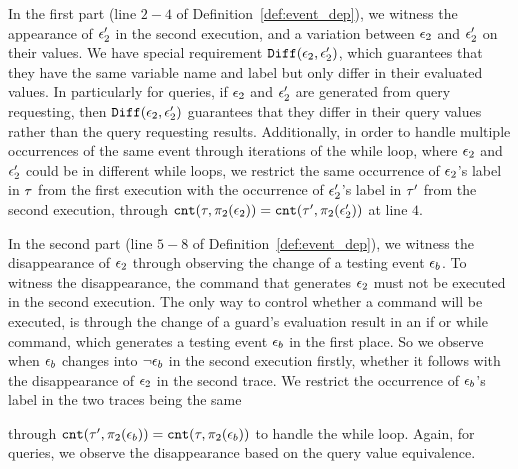 {%
In the first part (line $2-4$ of Definition~\ref{def:event_dep}), we witness
the appearance of $\mathtt{\epsilon}_2'$ in the second execution, and
a variation between $\mathtt{\epsilon}_2$ and $\mathtt{\epsilon}_2'$ on their values.
We have special requirement $\mathtt{Diff}(\mathtt{\epsilon}_2, \mathtt{\epsilon}_2')$, which guarantees that they
have the same variable name and label but only differ 
in their evaluated values.
In particularly for queries, if $\mathtt{\epsilon}_2$ and $\mathtt{\epsilon}_2'$ are 
generated from query requesting, then $\mathtt{Diff}(\mathtt{\epsilon}_2, \mathtt{\epsilon}_2')$ guarantees that
they differ in their query values rather than the 
query requesting results. 
Additionally, in order to handle multiple occurrences of the same event through iterations of the while loop,
 where  $\mathtt{\epsilon}_2$ and $\mathtt{\epsilon}_2'$ could be 
in different while loops,
we restrict the same occurrence of $\mathtt{\epsilon}_2$'s label in $\mathtt{\tau}$ from the first execution with  the occurrence of $\mathtt{\epsilon}_2'$'s label in $\mathtt{\tau}'$ from the second execution,
through $\mathtt{cnt}(\mathtt{\tau}, \pi_2(\mathtt{\epsilon}_2))
= 
\mathtt{cnt}(\mathtt{\tau}', \pi_2(\mathtt{\epsilon}_2'))$ at line $4$.

In the second part (line $5-8$ of Definition~\ref{def:event_dep}), we 
witness
the disappearance of $\mathtt{\epsilon}_2$ through observing the change of a testing event $\mathtt{\epsilon}_b$.
To witness
the disappearance, the command that generates $\mathtt{\epsilon}_2$ must not be executed in 
the second execution. 
The only way to control whether a command will be executed, is through the change of a guard's 
evaluation result in an if or while command, which generates a testing event $\mathtt{\epsilon}_b$ in the first place.
So we observe when
$\mathtt{\epsilon}_b$ changes into $\neg \mathtt{\epsilon}_b$ in the second execution firstly, 
whether it follows with the disappearance of $\mathtt{\epsilon}_2$ in the second trace. We restrict the occurrence of $\mathtt{\epsilon}_b$'s label in the two traces being the same
}
through $\mathtt{cnt}(\mathtt{\tau}', \pi_2(\mathtt{\epsilon}_b)) = \mathtt{cnt}(\mathtt{\tau}, \pi_2(\mathtt{\epsilon}_b))$ to handle the while loop.
Again, for queries, we observe the disappearance based on the query value equivalence.
%

